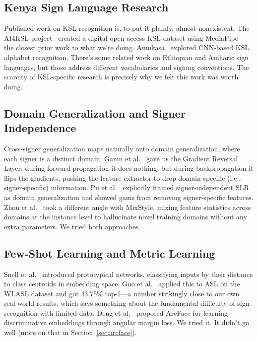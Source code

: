 \documentclass[conference]{IEEEtran}
\begin{document}
\subsection{Kenya Sign Language Research}

Published work on KSL recognition is, to put it plainly, almost nonexistent. The AI4KSL project~\cite{ai4ksl2024} created a digital open-access KSL dataset using MediaPipe---the closest prior work to what we're doing. Amukasa~\cite{amukasa2021} explored CNN-based KSL alphabet recognition. There's some related work on Ethiopian and Amharic sign languages, but those address different vocabularies and signing conventions. The scarcity of KSL-specific research is precisely why we felt this work was worth doing.

\subsection{Domain Generalization and Signer Independence}

Cross-signer generalization maps naturally onto domain generalization, where each signer is a distinct domain. Ganin et al.~\cite{ganin2016domain} gave us the Gradient Reversal Layer: during forward propagation it does nothing, but during backpropagation it flips the gradients, pushing the feature extractor to drop domain-specific (i.e., signer-specific) information. Pu et al.~\cite{pu2024signer} explicitly framed signer-independent SLR as domain generalization and showed gains from removing signer-specific features. Zhou et al.~\cite{zhou2021mixstyle} took a different angle with MixStyle, mixing feature statistics across domains at the instance level to hallucinate novel training domains without any extra parameters. We tried both approaches.

\subsection{Few-Shot Learning and Metric Learning}

Snell et al.~\cite{snell2017prototypical} introduced prototypical networks, classifying inputs by their distance to class centroids in embedding space. Guo et al.~\cite{guo2024fewshot} applied this to ASL on the WLASL dataset and got 43.75\% top-1---a number strikingly close to our own real-world results, which says something about the fundamental difficulty of sign recognition with limited data. Deng et al.~\cite{deng2019arcface} proposed ArcFace for learning discriminative embeddings through angular margin loss. We tried it. It didn't go well (more on that in Section~\ref{sec:arcface}).
\end{document}
